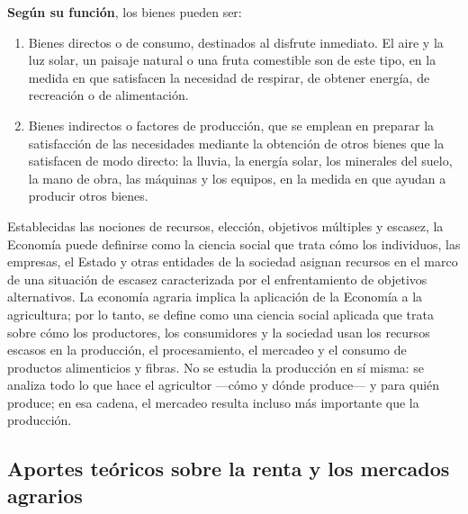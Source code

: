 \documentclass[
  man,
  floatsintext,
  longtable,
  a4paper,
  nolmodern,
  notxfonts,
  notimes,
  12pt,
  colorlinks=true,linkcolor=blue,citecolor=blue,urlcolor=blue]{apa7}
\begin{document}
\textbf{Según su función}, los bienes pueden ser:

\begin{enumerate}
\def\labelenumi{\arabic{enumi}.}
\item
  Bienes directos o de consumo, destinados al disfrute inmediato. El
  aire y la luz solar, un paisaje natural o una fruta comestible son de
  este tipo, en la medida en que satisfacen la necesidad de respirar, de
  obtener energía, de recreación o de alimentación.
\item
  Bienes indirectos o factores de producción, que se emplean en preparar
  la satisfacción de las necesidades mediante la obtención de otros
  bienes que la satisfacen de modo directo: la lluvia, la energía solar,
  los minerales del suelo, la mano de obra, las máquinas y los equipos,
  en la medida en que ayudan a producir otros bienes.
\end{enumerate}

Establecidas las nociones de recursos, elección, objetivos múltiples y
escasez, la Economía puede definirse como la ciencia social que trata
cómo los individuos, las empresas, el Estado y otras entidades de la
sociedad asignan recursos en el marco de una situación de escasez
caracterizada por el enfrentamiento de objetivos alternativos. La
economía agraria implica la aplicación de la Economía a la agricultura;
por lo tanto, se define como una ciencia social aplicada que trata sobre
cómo los productores, los consumidores y la sociedad usan los recursos
escasos en la producción, el procesamiento, el mercadeo y el consumo de
productos alimenticios y fibras. No se estudia la producción en sí
misma: se analiza todo lo que hace el agricultor ---cómo y dónde
produce--- y para quién produce; en esa cadena, el mercadeo resulta
incluso más importante que la producción.

\subsection{Aportes teóricos sobre la renta y los mercados
agrarios}\label{aportes-teuxf3ricos-sobre-la-renta-y-los-mercados-agrarios}
\end{document}
